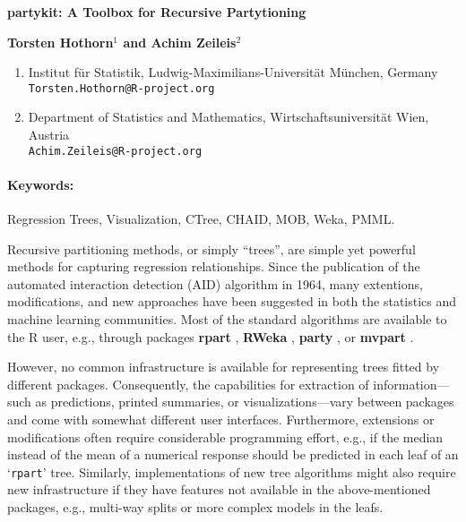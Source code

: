 \documentclass[10pt,a4paper]{article}
\renewcommand{\title}[1]{\begin{center}{\bf \LARGE #1}\end{center}}
\renewcommand{\author}[1]{\begin{center}{\bf #1}\end{center}}
\newenvironment{affiliations}{\footnotesize \begin{enumerate}}{\end{enumerate}}
\newenvironment{keywords}{\paragraph{Keywords:}}{\bigskip}
\let\code=\texttt
\let\pkg=\textbf
\let\proglang=\textsf
\newcommand{\class}[1]{`\code{#1}'}
\begin{document}
\pagestyle{empty}

\title{\pkg{partykit}: A Toolbox for Recursive Partytioning}
\author{Torsten Hothorn$^{1}$ and Achim Zeileis$^{2}$}

\begin{affiliations}
  \item Institut f\"ur Statistik, Ludwig-Maximilians-Universit\"at M\"unchen, Germany\\
        \texttt{Torsten.Hothorn@R-project.org}
  \item Department of Statistics and Mathematics, Wirtschaftsuniversit\"at Wien, Austria\\
        \texttt{Achim.Zeileis@R-project.org}
\end{affiliations}

\begin{keywords}
Regression Trees, Visualization, CTree, CHAID, MOB, Weka, PMML.
\end{keywords}

Recursive partitioning methods, or simply ``trees'', are simple yet powerful
methods for capturing regression relationships. Since the publication of the
automated interaction detection (AID) algorithm in 1964, many extentions,
modifications, and new approaches have been suggested in both the statistics
and machine learning communities. Most of the standard algorithms are
available to the \proglang{R} user, e.g., through packages
\pkg{rpart} \citep{partykit:rpart},
\pkg{RWeka} \citep{partykit:RWeka},
\pkg{party} \citep{partykit:party}, or
\pkg{mvpart} \citep{partykit:mvpart}.

However, no common infrastructure is available for representing trees
fitted by different packages. Consequently, the capabilities for extraction of
information---such as predictions, printed summaries, or visualizations---vary
between packages and come with somewhat different user interfaces.
Furthermore, extensions or modifications often require considerable
programming effort, e.g., if the median instead of the mean of a numerical
response should be predicted in each leaf of an \class{rpart} tree.
Similarly, implementations of new tree algorithms might also require new
infrastructure if they have features not available in the above-mentioned
packages, e.g., multi-way splits or more complex models in the leafs.
\end{document}
